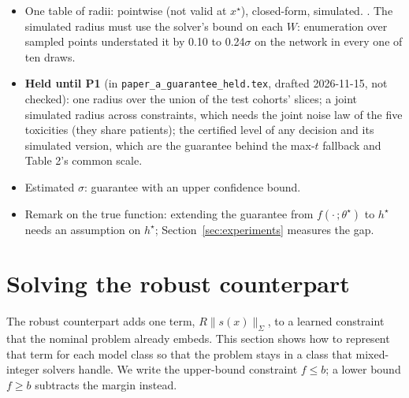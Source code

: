 \begin{outline}
\begin{itemize}
  \item One table of radii: pointwise (not valid at $x^\star$), closed-form,
    simulated. . The
    simulated radius must use the solver's bound on each $W$: enumeration over
    sampled points understated it by 0.10 to 0.24$\sigma$ on the network in
    every one of ten draws.
  \item \textbf{Held until P1} (in \texttt{paper\_a\_guarantee\_held.tex},
    drafted 2026-11-15, not checked): one radius over the union of the test
    cohorts' slices; a joint simulated radius across constraints, which needs
    the joint noise law of the five toxicities (they share patients); the
    certified level of any decision and its simulated version, which are the
    guarantee behind the max-$t$ fallback and Table 2's common scale.
  \item Estimated $\sigma$: guarantee with an upper confidence bound.
  \item Remark on the true function: extending the guarantee from
    $f(\cdot\,;\theta^\star)$ to $h^\star$ needs an assumption on $h^\star$;
    Section~\ref{sec:experiments} measures the gap.
\end{itemize}
\end{outline}

\section{Solving the robust counterpart}\label{sec:solving}

The robust counterpart adds one term, $R\|s(x)\|_\Sigma$, to a learned
constraint that the nominal problem already embeds. This section shows how to
represent that term for each model class so that the problem stays in a class
that mixed-integer solvers handle. We write the
upper-bound constraint $f \le b$; a lower bound $f \ge b$ subtracts the margin
instead.


